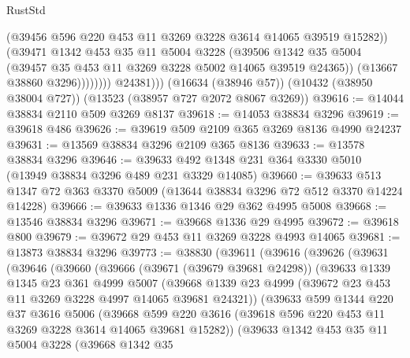 \begin{lexlean}{RustStd}
\begin{coremodule}
                        (@39456 @596 @220 @453 @11 @3269 @3228 @3614 @14065 @39519 @15282))
                      (@39471
                        @1342
                        @453
                        @35
                        @11
                        @5004
                        @3228
                        (@39506
                          @1342
                          @35
                          @5004
                          (@39457 @35 @453 @11 @3269 @3228 @5002 @14065 @39519 @24365))
                        (@13667 @38860 @3296))))))))
          @24381)))
    (@16634 (@38946 @57))
    (@10432 (@38950 @38004 @727))
    (@13523 (@38957 @727 @2072 @8067 @3269))
@39616 := @14044 @38834 @2110 @509 @3269 @8137
@39618 := @14053 @38834 @3296
@39619 := @39618 @486
@39626 := @39619 @509 @2109 @365 @3269 @8136 @4990 @24237
@39631 := @13569 @38834 @3296 @2109 @365 @8136
@39633 := @13578 @38834 @3296
@39646 := @39633 @492 @1348 @231 @364 @3330 @5010 (@13949 @38834 @3296 @489 @231 @3329 @14085)
@39660 := @39633 @513 @1347 @72 @363 @3370 @5009 (@13644 @38834 @3296 @72 @512 @3370 @14224 @14228)
@39666 := @39633 @1336 @1346 @29 @362 @4995 @5008
@39668 := @13546 @38834 @3296
@39671 := @39668 @1336 @29 @4995
@39672 := @39618 @800
@39679 := @39672 @29 @453 @11 @3269 @3228 @4993 @14065
@39681 := @13873 @38834 @3296
@39773 := @38830
    (@39611
      (@39616
        (@39626
          (@39631
            (@39646
              (@39660
                (@39666
                  (@39671 (@39679 @39681 @24298))
                  (@39633
                    @1339
                    @1345
                    @23
                    @361
                    @4999
                    @5007
                    (@39668
                      @1339
                      @23
                      @4999
                      (@39672 @23 @453 @11 @3269 @3228 @4997 @14065 @39681 @24321))
                    (@39633
                      @599
                      @1344
                      @220
                      @37
                      @3616
                      @5006
                      (@39668
                        @599
                        @220
                        @3616
                        (@39618 @596 @220 @453 @11 @3269 @3228 @3614 @14065 @39681 @15282))
                      (@39633
                        @1342
                        @453
                        @35
                        @11
                        @5004
                        @3228
                        (@39668
                          @1342
                          @35

\end{coremodule}
\end{lexlean}
